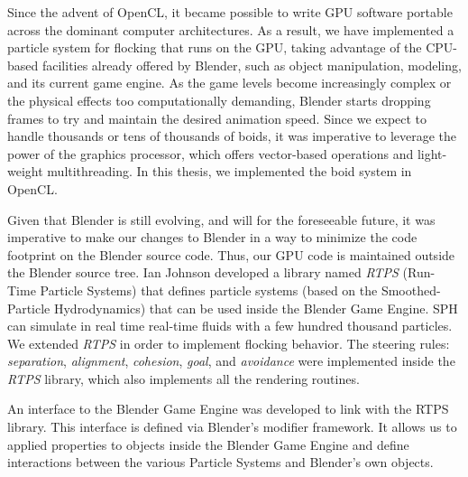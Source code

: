 Since the advent of OpenCL\cite{opencl}, it became possible to write GPU software portable across the dominant computer architectures. As a result, we have implemented a particle system for flocking that runs on the GPU, taking advantage of the CPU-based facilities already offered by Blender, such as object manipulation, modeling, and its current game engine. As the game levels  become increasingly complex or the physical effects too computationally demanding, Blender starts dropping frames to try and maintain the desired animation speed. Since we expect to handle thousands or tens of thousands of boids, it was imperative to leverage the power of the graphics processor\cite{nvidiaGPU}, which offers vector-based operations and light-weight multithreading. In this thesis, we implemented the boid system in OpenCL.



Given that Blender is still evolving, and will for the foreseeable future, it was imperative to make our changes to Blender in a way to minimize the code footprint on the Blender source code. Thus, our
GPU code is maintained outside the Blender source tree. Ian Johnson\cite{ianBlog} developed a library named \textit{RTPS} (Run-Time Particle Systems) that defines particle systems (based on the Smoothed-Particle Hydrodynamics) that can be used inside the Blender Game Engine. SPH can simulate in real time real-time fluids with a few hundred thousand particles. We extended \textit{RTPS} in order to implement flocking behavior. The steering rules: \textit{separation}, \textit{alignment}, \textit{cohesion}, \textit{goal}, and \textit{avoidance} were implemented inside the \textit{RTPS} library, which also implements all the rendering routines.



An interface to the Blender Game Engine was developed to link with the RTPS library. This interface is defined via Blender's modifier framework. It allows us to applied properties to objects inside the Blender Game Engine and define interactions between the various Particle Systems and Blender's own objects.


